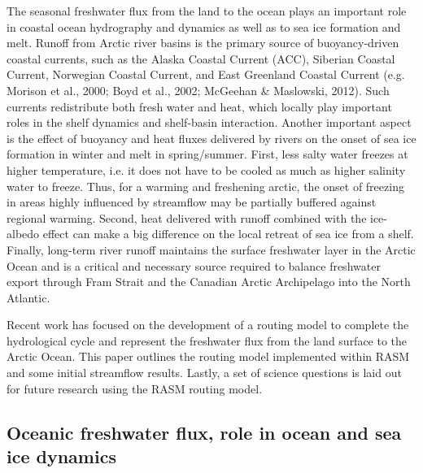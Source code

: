 The seasonal freshwater flux from the land to the ocean plays an important role in coastal ocean hydrography and dynamics as well as to sea ice formation and melt.
Runoff from Arctic river basins is the primary source of buoyancy-driven coastal currents, such as the Alaska Coastal Current (ACC), Siberian Coastal Current, Norwegian Coastal Current, and East Greenland Coastal Current (e.g. Morison et al., 2000; Boyd et al., 2002; McGeehan \& Maslowski, 2012).
Such currents redistribute both fresh water and heat, which locally play important roles in the shelf dynamics and shelf-basin interaction. Another important aspect is the effect of buoyancy and heat fluxes delivered by rivers on the onset of sea ice formation in winter and melt in spring/summer.
First, less salty water freezes at higher temperature, i.e. it does not have to be cooled as much as higher salinity water to freeze.
Thus, for a warming and freshening arctic, the onset of freezing in areas highly influenced by streamflow may be partially buffered against regional warming.
Second, heat delivered with runoff combined with the ice-albedo effect can make a big difference on the local retreat of sea ice from a shelf.
Finally, long-term river runoff maintains the surface freshwater layer in the Arctic Ocean and is a critical and necessary source required to balance freshwater export through Fram Strait and the Canadian Arctic Archipelago into the North Atlantic.

Recent work has focused on the development of a routing model to complete the hydrological cycle and represent the freshwater flux from the land surface to the Arctic Ocean.
This paper outlines the routing model implemented within RASM and some initial streamflow results.
Lastly, a set of science questions is laid out for future research using the RASM routing model.
  
\subsection{Oceanic freshwater flux, role in ocean and sea ice dynamics}


